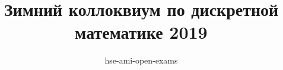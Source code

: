 \documentclass{article}
\author{hse-ami-open-exams}
\title{Зимний коллоквиум по дискретной математике 2019}
\date{}
\begin{document}
\maketitle
\tableofcontents{}
\newpage


\newpage

\newpage

\newpage

\newpage

\newpage

\newpage

\newpage

\newpage

\newpage

\newpage

\newpage

\newpage

\newpage

\newpage

\newpage

\newpage

\newpage

\newpage

\newpage

\newpage

\newpage

\newpage

\newpage

\newpage

\newpage

\newpage

\newpage

\newpage
\end{document}
